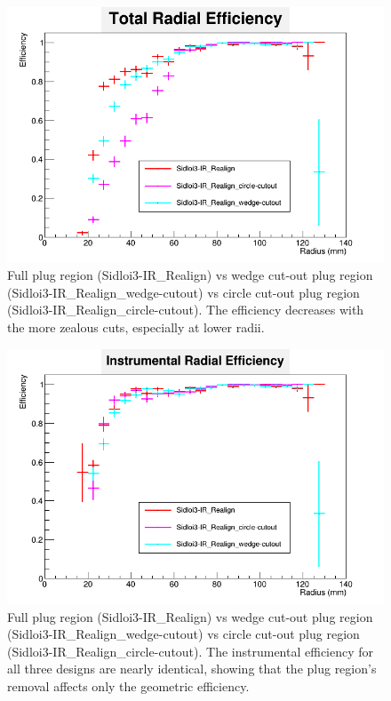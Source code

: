 \documentclass{report}
\begin{document}
                \begin{figure}[H] 
                    \includegraphics[height=.4\textheight]{RadialEfficiency_total_geom}
                    \centering
                    \caption{Full plug region (Sidloi3-IR\_Realign) vs wedge cut-out plug region
                            (Sidloi3-IR\_Realign\_wedge-cutout) vs circle cut-out plug region
                            (Sidloi3-IR\_Realign\_circle-cutout). The efficiency decreases with 
                            the more zealous cuts, especially at lower radii.}
                    \label{fig__geom_beamcal_total}
                \end{figure}
                \begin{figure}[H]
                    \includegraphics[height=.4\textheight]{RadialEfficiency_instrumental_geom}
                    \centering
                    \caption{Full plug region (Sidloi3-IR\_Realign) vs wedge cut-out plug region (Sidloi3-IR\_Realign\_wedge-cutout) vs circle cut-out plug region (Sidloi3-IR\_Realign\_circle-cutout). The instrumental efficiency for all three designs are nearly identical, showing that the plug region's removal affects only the geometric efficiency.}
                    \label{fig__geom_beamcal_inst}
                \end{figure}
\end{document}
